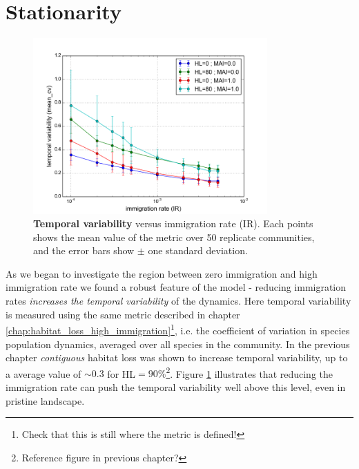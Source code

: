 \clearpage
\section{Stationarity}
\label{sec:intro_stationarity}

\begin{figure}
	\centering
	\includegraphics[width=0.8\textwidth]{"figures/stationarity/cov_vs_ir"}
	\caption{\textbf{Temporal variability} versus immigration rate (IR). Each points shows the mean value of the metric over 50 replicate communities, and the error bars show $\pm$ one standard deviation.}
	\label{fig:cov_vs_ir}
\end{figure}

As we began to investigate the region between zero immigration and high immigration rate we found a robust feature of the model - reducing immigration rates \emph{increases the temporal variability} of the dynamics. Here temporal variability is measured using the same metric described in chapter \ref{chap:habitat_loss_high_immigration}\footnote{Check that this is still where the metric is defined!}, i.e. the coefficient of variation in species population dynamics, averaged over all species in the community. In the previous chapter \emph{contiguous} habitat loss was shown to increase temporal variability, up to a average value of $\sim 0.3$ for HL$=90\%$\footnote{Reference figure in previous chapter?}. Figure \ref{fig:cov_vs_ir} illustrates that reducing the immigration rate can push the temporal variability well above this level, even in pristine landscape. 

